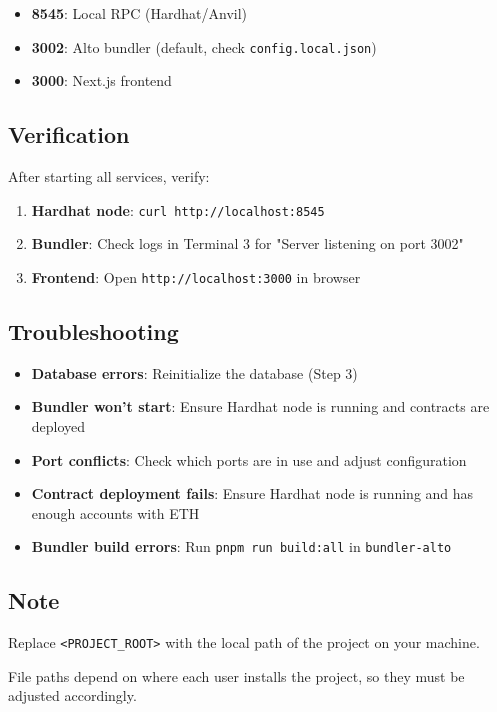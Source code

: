 \begin{itemize}
  \item \textbf{8545}: Local RPC (Hardhat/Anvil)
  \item \textbf{3002}: Alto bundler (default, check \texttt{config.local.json})
  \item \textbf{3000}: Next.js frontend
\end{itemize}

\subsection{Verification}

After starting all services, verify:

\begin{enumerate}
  \item \textbf{Hardhat node}: \texttt{curl http://localhost:8545}
  \item \textbf{Bundler}: Check logs in Terminal 3 for "Server listening on port 3002"
  \item \textbf{Frontend}: Open \texttt{http://localhost:3000} in browser
\end{enumerate}

\subsection{Troubleshooting}

\begin{itemize}
  \item \textbf{Database errors}: Reinitialize the database (Step 3)
  \item \textbf{Bundler won't start}: Ensure Hardhat node is running and contracts are deployed
  \item \textbf{Port conflicts}: Check which ports are in use and adjust configuration
  \item \textbf{Contract deployment fails}: Ensure Hardhat node is running and has enough accounts with ETH
  \item \textbf{Bundler build errors}: Run \texttt{pnpm run build:all} in \texttt{bundler-alto}
\end{itemize}

\subsection{Note}

Replace \texttt{<PROJECT\_ROOT>} with the local path of the project on your machine.

File paths depend on where each user installs the project, so they must be adjusted accordingly.





